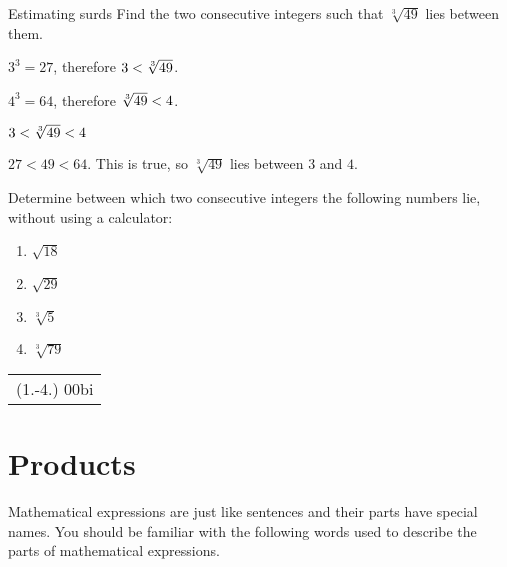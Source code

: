 \begin{wex}{Estimating surds}
{%
Find the two consecutive integers such that $\sqrt[3]{49}$ lies between them.
}
{%

   ${3}^{3}=27$, therefore $3<{}\sqrt[3]{49}$.

 ${4}^{3}=64$, therefore $\sqrt[3]{49}<{}4$. 

$3<{}\sqrt[3]{49}<{}4$

$27<49<64$. This is true, so $\sqrt[3]{49}$ lies between $3$ and $4$.
}
\end{wex}

\begin{exercises}{}
{Determine between which two consecutive integers the following numbers lie, without using a calculator:
\begin{enumerate}[itemsep=0pt, label=\textbf{\arabic*}. ]
\item $\sqrt{18}$
\item $\sqrt{29}$
\item $\sqrt[3]{5}$
\item $\sqrt[3]{79}$

\end{enumerate}
\practiceinfo 
\par 
 \par \begin{tabular}[h]{c}
 (1.-4.) 00bi\end{tabular}
}
\end{exercises}



\section{Products}
\setcounter{figure}{1}
\setcounter{subfigure}{1}
%   
\nopagebreak
Mathematical expressions are just like sentences and their parts have special names. You should be familiar with the following words used to describe the parts of  mathematical expressions.\par 

